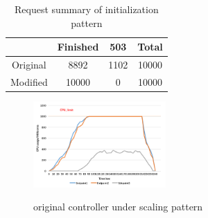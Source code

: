 \hspace{0pt}
\begin{table}[htbp]
 \begin{center}
  \begin{tabular}{c|c|c|c}
   \hline
            & Finished & 503  & Total \\  \hline
   Original & 8892     & 1102 & 10000 \\ \hline
   Modified & 10000    & 0    & 10000 \\ \hline
  \end{tabular}
 \end{center}
 \caption{Request summary of initialization pattern}
 \label{table:request_summary1}
\end{table}


\begin{figure}[!htb]
 \centering
 \includegraphics[width=0.45\textwidth]{images/data3.png}\\
 \caption{original controller under scaling pattern}
 \label{fig:original_scaling}
\end{figure}


